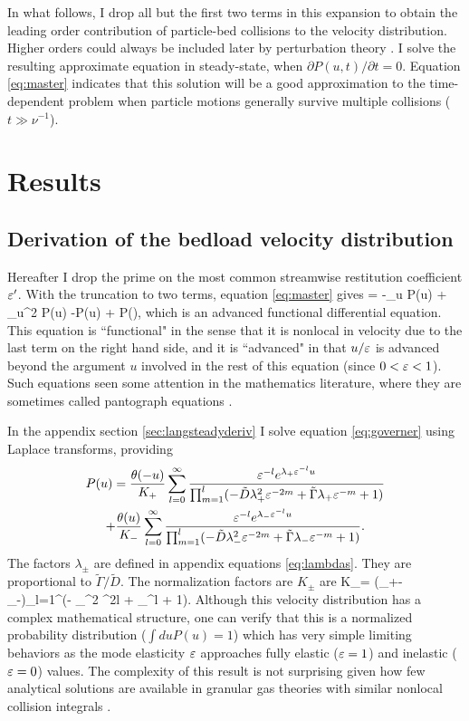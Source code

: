 In what follows, I drop all but the first two terms in this expansion to obtain the leading order contribution of particle-bed collisions to the velocity distribution.
Higher orders could always be included later by perturbation theory \citep{Morse1953}.
I solve the resulting approximate equation in steady-state, when $\partial P(u,t)/\partial t = 0$. Equation \ref{eq:master} indicates that this solution will be a good approximation to the time-dependent problem when particle motions generally survive multiple collisions ($t\gg \nu^{-1}$).

\section{Results}
\label{sec:langresults}

\subsection{Derivation of the bedload velocity distribution}
\label{sec:langsolution}
Hereafter I drop the prime on the most common streamwise restitution coefficient $\varepsilon'$.
With the truncation to two terms, equation \ref{eq:master} gives 
 = -\tilde{\Gamma}\partial_u P(u) + \partial_u^2 P(u) -P(u) +  P\big(\big),\label{eq:governer} \ee
which is an advanced functional differential equation. This equation is ``functional" in the sense that it is nonlocal in velocity due to the last term on the right hand side, and it is ``advanced" in that $u/\varepsilon$ is advanced beyond the argument $u$ involved in the rest of this equation (since $0<\varepsilon<1$).
Such equations seen some attention in the mathematics literature, where they are sometimes called pantograph equations \citep{Hall1989, Kim1998,Zaidi2015}.

In the appendix section \ref{sec:langsteadyderiv} I solve equation \ref{eq:governer} using Laplace transforms, providing
\begin{multline} P(u) = \frac{\theta(-u)}{K_+}\sum_{l=0}^\infty \frac{\varepsilon^{-l}e^{\lambda_+\varepsilon^{-l}u}}{\prod_{m=1}^l(-\tilde{D} \lambda_+^2 \varepsilon^{-2m} + \tilde{\Gamma} \lambda_+ \varepsilon^{-m} + 1) } 
	\\+ \frac{\theta(u)}{K_-}\sum_{l=0}^\infty \frac{\varepsilon^{-l}e^{\lambda_-\varepsilon^{-l}u}}{\prod_{m=1}^l(- \tilde{D} \lambda_-^2 \varepsilon^{-2m} + \tilde{\Gamma} \lambda_- \varepsilon^{-m} + 1) } \label{eq:steadystate}. \end{multline}
The factors $\lambda_\pm$ are defined in appendix equations \ref{eq:lambdas}. They are proportional to $\tilde{\Gamma}/\tilde{D}$. 
The normalization factors are $K_\pm$ are 
\be K_\pm = (\lambda_+-\lambda_-)\prod_{l=1}^\infty (- \lambda_\pm^2 \ve^{2l} +\tilde{\Gamma} \lambda_\pm \ve^{l} + 1). \ee
Although this velocity distribution has a complex mathematical structure, one can verify that this is a normalized probability distribution ($\int du P(u) = 1$) which has very simple limiting behaviors as the mode elasticity $\varepsilon$ approaches fully elastic ($\varepsilon=1$) and inelastic ($\varepsilon = 0$) values. The complexity of this result is not surprising given how few analytical solutions are available in granular gas theories with similar nonlocal collision integrals \citep[e.g.][]{Brilliantov2004}.

